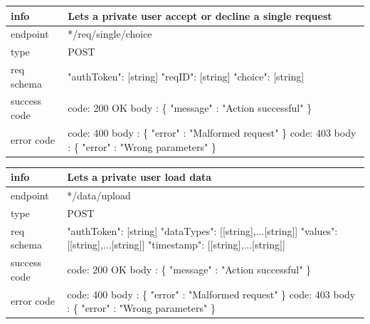 \documentclass[titlepage]{article}
\begin{document}
\vspace{\baselineskip}

\begin{tabularx}{\textwidth}{lX} \hline
    info & Lets a private user accept or decline a single request \\ \hline
    endpoint & */req/single/choice \\ \hline
    type & POST \\ \hline
    req schema & 
    "authToken": [string] \newline
    "reqID": [string] \newline
    "choice": [string] \\ \hline
    success code &
        code: 200 OK \newline  
        body : \{ \newline
        "message" : "Action successful" \newline
        \} \\ \hline
    error code &
        code: 400 \newline
        body : \{ "error" : "Malformed request" \} \newline \newline
        code: 403 \newline
        body : \{ "error" : "Wrong parameters" \}\\ \hline
\end{tabularx}
		
\vspace{\baselineskip}

\begin{tabularx}{\textwidth}{lX} \hline
    info & Lets a private user load data \\ \hline
    endpoint & */data/upload \\ \hline
    type & POST \\ \hline
    req schema & 
    "authToken": [string] \newline
    "dataTypes": [[string],...[string]] \newline
    "values": [[string],...[string]] \newline
    "timestamp": [[string],...[string]] \\ \hline
    success code &
        code: 200 OK \newline \newline 
        body : \{ \newline
        "message" : "Action successful" \newline
        \} \\ \hline
    error code &
        code: 400 \newline
        body : \{ "error" : "Malformed request" \} \newline \newline
        code: 403 \newline
        body : \{ "error" : "Wrong parameters" \} \\ \hline
\end{tabularx}
		
\end{document}
